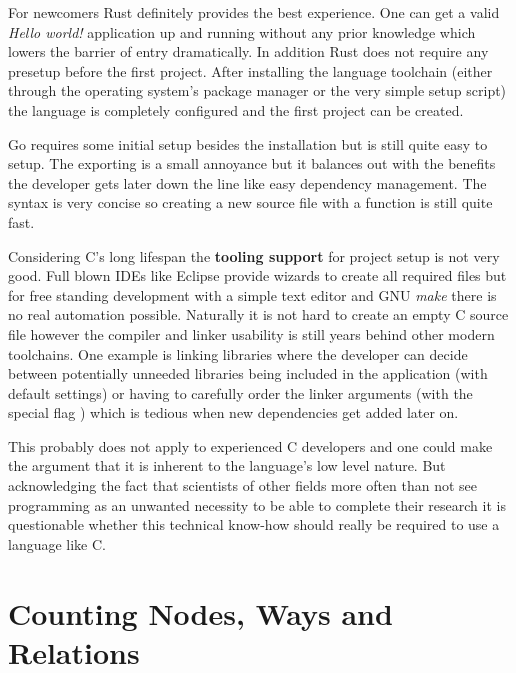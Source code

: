 For newcomers Rust definitely provides the best experience. One can get a valid \textit{Hello world!} application up and running without any prior knowledge which lowers the barrier of entry dramatically. In addition Rust does not require any presetup before the first project. After installing the language toolchain (either through the operating system's package manager or the very simple setup script) the language is completely configured and the first project can be created.

Go requires some initial setup besides the installation but is still quite easy to setup. The  exporting is a small annoyance but it balances out with the benefits the developer gets later down the line like easy dependency management. The syntax is very concise so creating a new source file with a  function is still quite fast.

Considering C's long lifespan the \textbf{tooling support} for project setup is not very good. Full blown IDEs like Eclipse provide wizards to create all required files but for free standing development with a simple text editor and GNU \textit{make} there is no real automation possible. Naturally it is not hard to create an empty C source file however the compiler and linker usability is still years behind other modern toolchains. One example is linking libraries where the developer can decide between potentially unneeded libraries being included in the application (with default settings) or having to carefully order the linker arguments (with the special flag ) which is tedious when new dependencies get added later on.

This probably does not apply to experienced C developers and one could make the argument that it is inherent to the language's low level nature. But acknowledging the fact that scientists of other fields more often than not see programming as an unwanted necessity to be able to complete their research it is questionable whether this technical know-how should really be required to use a language like C.

\section{Counting Nodes, Ways and Relations}
\label{sec:Implementation::Counting}

